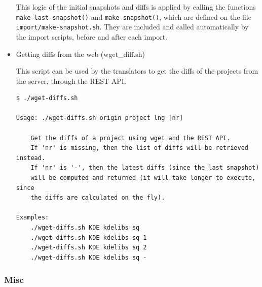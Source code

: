 \documentclass[11pt]{article}
\begin{document}
\begin{itemize}
     This logic of the initial snapshots and diffs is applied by calling
     the functions \texttt{make-last-snapshot()} and \texttt{make-snapshot()}, which
     are defined on the file \texttt{import/make-snapshot.sh}. They are
     included and called automatically by the import scripts, before and
     after each import.


\item Getting diffs from the web (wget\_{}diff.sh)\\
\label{sec-8.4.4.6}


     This script can be used by the translators to get the diffs of the
     projects from the server, through the REST API.


\begin{verbatim}
$ ./wget-diffs.sh

Usage: ./wget-diffs.sh origin project lng [nr]

    Get the diffs of a project using wget and the REST API.
    If 'nr' is missing, then the list of diffs will be retrieved instead.
    If 'nr' is '-', then the latest diffs (since the last snapshot)
    will be computed and returned (it will take longer to execute, since
    the diffs are calculated on the fly).

Examples:
    ./wget-diffs.sh KDE kdelibs sq
    ./wget-diffs.sh KDE kdelibs sq 1
    ./wget-diffs.sh KDE kdelibs sq 2
    ./wget-diffs.sh KDE kdelibs sq -
\end{verbatim}




\end{itemize} %
\subsubsection{Misc}
\label{sec-8.4.5}
\end{document}
